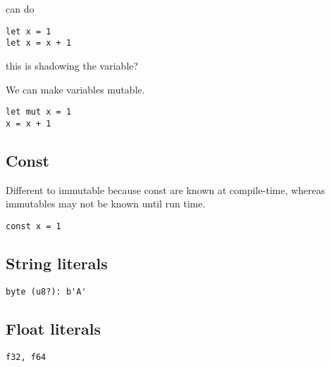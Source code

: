 can do

\begin{verbatim}
let x = 1
let x = x + 1

\end{verbatim}
this is shadowing the variable?

We can make variables mutable.
\begin{verbatim}
let mut x = 1
x = x + 1
\end{verbatim}


\subsection{Const}

Different to immutable because const are known at compile-time, whereas immutables may not be known until run time.
\begin{verbatim}
const x = 1

\end{verbatim}

\subsection{String literals}
\begin{verbatim}
byte (u8?): b'A'
\end{verbatim}

\subsection{Float literals}

\begin{verbatim}
f32, f64
\end{verbatim}

